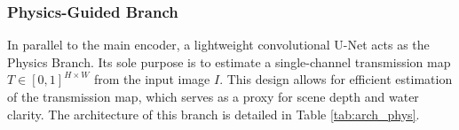 \documentclass[10pt,twocolumn,letterpaper]{article}
\begin{document}
\subsubsection{Physics-Guided Branch}
In parallel to the main encoder, a lightweight convolutional U-Net acts as the Physics Branch. Its sole purpose is to estimate a single-channel transmission map $T \in [0, 1]^{H \times W}$ from the input image $I$. This design allows for efficient estimation of the transmission map, which serves as a proxy for scene depth and water clarity. The architecture of this branch is detailed in Table \ref{tab:arch_phys}.

\begin{center}
\label{tab:arch_phys}
\end{center}
\end{document}
